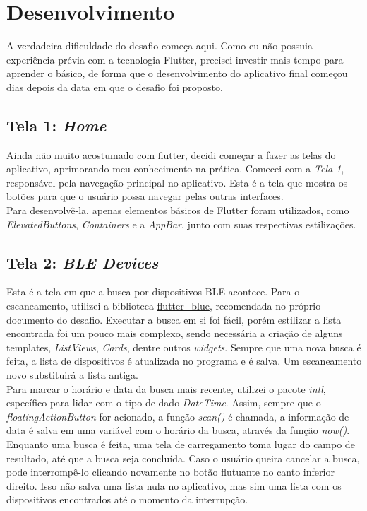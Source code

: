 \documentclass[a4paper,12pt]{article}
\begin{document}
\section{Desenvolvimento}
A verdadeira dificuldade do desafio começa aqui. Como eu não possuia experiência prévia com a tecnologia Flutter, precisei investir mais tempo para aprender o básico, de forma que o desenvolvimento do aplicativo final começou dias depois da data em que o desafio foi proposto.
\subsection{Tela 1: \textit{Home}}
Ainda não muito acostumado com flutter, decidi começar a fazer as telas do aplicativo, aprimorando meu conhecimento na prática. Comecei com a \textit{Tela 1}, responsável pela navegação principal no aplicativo. Esta é a tela que mostra os botões para que o usuário possa navegar pelas outras interfaces.\\
Para desenvolvê-la, apenas elementos básicos de Flutter foram utilizados, como \textit{ElevatedButtons}, \textit{Containers} e a \textit{AppBar}, junto com suas respectivas estilizações.
\subsection{Tela 2: \textit{BLE Devices}}
Esta é a tela em que a busca por dispositivos BLE acontece. Para o escaneamento, utilizei a biblioteca \href{https://pub.dev/packages/flutter\_blue}{flutter\_blue}, recomendada no próprio documento do desafio. Executar a busca em si foi fácil, porém estilizar a lista encontrada foi um pouco mais complexo, sendo necessária a criação de alguns templates, \textit{ListViews}, \textit{Cards}, dentre outros \textit{widgets}. Sempre que uma nova busca é feita, a lista de dispositivos é atualizada no programa e é salva. Um escaneamento novo substituirá a lista antiga.\\
Para marcar o horário e data da busca mais recente, utilizei o pacote \textit{intl}, específico para lidar com o tipo de dado \textit{DateTime}. Assim, sempre que o \textit{floatingActionButton} for acionado, a função \textit{scan()} é chamada, a informação de data é salva em uma variável com o horário da busca, através da função \textit{now()}.\\
Enquanto uma busca é feita, uma tela de carregamento toma lugar do campo de resultado, até que a busca seja concluída. Caso o usuário queira cancelar a busca, pode interrompê-lo clicando novamente no botão flutuante no canto inferior direito. Isso não salva uma lista nula no aplicativo, mas sim uma lista com os dispositivos encontrados até o momento da interrupção.
\end{document}
